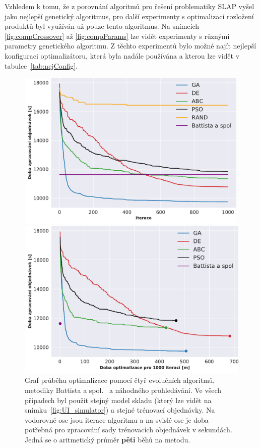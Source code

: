 Vzhledem k tomu, že z porovnání algoritmů pro řešení problematiky SLAP vyšel jako nejlepší genetický algoritmus, pro další experimenty s optimalizací rozložení produktů byl využíván už pouze tento algoritmus. Na snímcích \ref{fig:compCrossover} až \ref{fig:compParams} lze vidět experimenty s různými parametry genetického algoritmu. Z těchto experimentů bylo možné najít nejlepší konfiguraci optimalizátoru, která byla nadále používána a kterou lze vidět v tabulce~\ref{tab:nejConfig}.

\begin{figure}[t]
    \centering
    \begin{minipage}{0.49\textwidth}
        \centering
        \includegraphics[width=0.99\textwidth]{figures/vyhodnoceni/plotComparisonTrain.pdf}
        \caption{Graf průběhu optimalizace pomocí čtyř evolučních algoritmů, metodiky Battista a spol.~\cite{slapSeacomp} a náhodného prohledávání. Ve všech případech byl použit stejný model skladu (který lze vidět na snímku~\ref{fig:UI_simulator}) a stejné trénovací objednávky. Na vodorovné ose jsou iterace algoritmu a na svislé ose je doba potřebná pro zpracování sady trénovacích objednávek v sekundách. Jedná se o aritmetický průměr \textbf{pěti} běhů na metodu.}
        \label{fig:vyhodnoceniGrafTrain}
    \end{minipage}\hfill
    \begin{minipage}{0.49\textwidth}
        \centering
        \includegraphics[width=1\linewidth]{figures/vyhodnoceni/plotComparisonTrainTime.pdf}

\end{minipage}
\end{figure}
